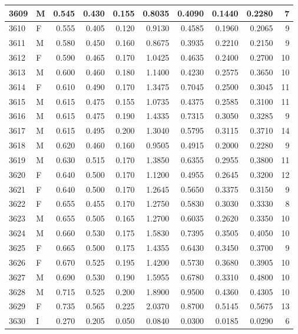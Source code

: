 \documentclass[9pt,twocolumn,twoside,]{pnas-new}
\begin{document}
\begin{tabular}{l|l|r|r|r|r|r|r|r|r}
\hline
3609 & M & 0.545 & 0.430 & 0.155 & 0.8035 & 0.4090 & 0.1440 & 0.2280 & 7\\
\hline
3610 & F & 0.555 & 0.405 & 0.120 & 0.9130 & 0.4585 & 0.1960 & 0.2065 & 9\\
\hline
3611 & M & 0.580 & 0.450 & 0.160 & 0.8675 & 0.3935 & 0.2210 & 0.2150 & 9\\
\hline
3612 & F & 0.590 & 0.465 & 0.170 & 1.0425 & 0.4635 & 0.2400 & 0.2700 & 10\\
\hline
3613 & M & 0.600 & 0.460 & 0.180 & 1.1400 & 0.4230 & 0.2575 & 0.3650 & 10\\
\hline
3614 & F & 0.610 & 0.490 & 0.170 & 1.3475 & 0.7045 & 0.2500 & 0.3045 & 11\\
\hline
3615 & M & 0.615 & 0.475 & 0.155 & 1.0735 & 0.4375 & 0.2585 & 0.3100 & 11\\
\hline
3616 & M & 0.615 & 0.475 & 0.190 & 1.4335 & 0.7315 & 0.3050 & 0.3285 & 9\\
\hline
3617 & M & 0.615 & 0.495 & 0.200 & 1.3040 & 0.5795 & 0.3115 & 0.3710 & 14\\
\hline
3618 & M & 0.620 & 0.460 & 0.160 & 0.9505 & 0.4915 & 0.2000 & 0.2280 & 9\\
\hline
3619 & M & 0.630 & 0.515 & 0.170 & 1.3850 & 0.6355 & 0.2955 & 0.3800 & 11\\
\hline
3620 & F & 0.640 & 0.500 & 0.170 & 1.1200 & 0.4955 & 0.2645 & 0.3200 & 12\\
\hline
3621 & F & 0.640 & 0.500 & 0.170 & 1.2645 & 0.5650 & 0.3375 & 0.3150 & 9\\
\hline
3622 & F & 0.655 & 0.455 & 0.170 & 1.2750 & 0.5830 & 0.3030 & 0.3330 & 8\\
\hline
3623 & M & 0.655 & 0.505 & 0.165 & 1.2700 & 0.6035 & 0.2620 & 0.3350 & 10\\
\hline
3624 & M & 0.660 & 0.530 & 0.175 & 1.5830 & 0.7395 & 0.3505 & 0.4050 & 10\\
\hline
3625 & F & 0.665 & 0.500 & 0.175 & 1.4355 & 0.6430 & 0.3450 & 0.3700 & 9\\
\hline
3626 & F & 0.670 & 0.525 & 0.195 & 1.4200 & 0.5730 & 0.3680 & 0.3905 & 10\\
\hline
3627 & M & 0.690 & 0.530 & 0.190 & 1.5955 & 0.6780 & 0.3310 & 0.4800 & 10\\
\hline
3628 & M & 0.715 & 0.525 & 0.200 & 1.8900 & 0.9500 & 0.4360 & 0.4305 & 10\\
\hline
3629 & F & 0.735 & 0.565 & 0.225 & 2.0370 & 0.8700 & 0.5145 & 0.5675 & 13\\
\hline
3630 & I & 0.270 & 0.205 & 0.050 & 0.0840 & 0.0300 & 0.0185 & 0.0290 & 6\\

\end{tabular}
\end{document}
